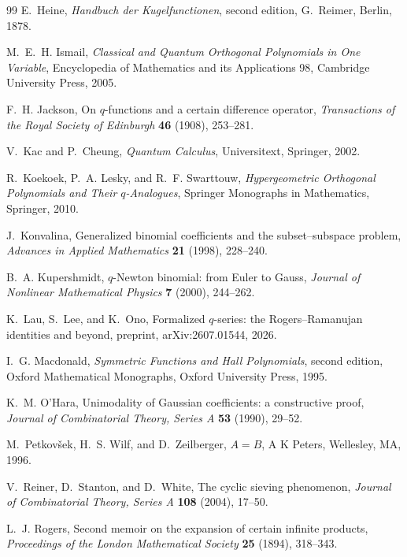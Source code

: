\documentclass[11pt,oneside,openany]{book}
\theoremstyle{definition}
\theoremstyle{remark}
\begin{document}
\begin{thebibliography}{99}
E.~Heine,
\emph{Handbuch der Kugelfunctionen}, second edition,
G.~Reimer, Berlin, 1878.

M.~E.~H. Ismail,
\emph{Classical and Quantum Orthogonal Polynomials in One Variable},
Encyclopedia of Mathematics and its Applications 98, Cambridge University Press, 2005.

F.~H. Jackson,
On $q$-functions and a certain difference operator,
\emph{Transactions of the Royal Society of Edinburgh} \textbf{46} (1908), 253--281.

V.~Kac and P.~Cheung,
\emph{Quantum Calculus},
Universitext, Springer, 2002.

R.~Koekoek, P.~A. Lesky, and R.~F. Swarttouw,
\emph{Hypergeometric Orthogonal Polynomials and Their $q$-Analogues},
Springer Monographs in Mathematics, Springer, 2010.

J.~Konvalina,
Generalized binomial coefficients and the subset--subspace problem,
\emph{Advances in Applied Mathematics} \textbf{21} (1998), 228--240.

B.~A. Kupershmidt,
$q$-Newton binomial: from Euler to Gauss,
\emph{Journal of Nonlinear Mathematical Physics} \textbf{7} (2000), 244--262.

K.~Lau, S.~Lee, and K.~Ono,
Formalized $q$-series: the Rogers--Ramanujan identities and beyond,
preprint, arXiv:2607.01544, 2026.

I.~G. Macdonald,
\emph{Symmetric Functions and Hall Polynomials}, second edition,
Oxford Mathematical Monographs, Oxford University Press, 1995.

K.~M. O'Hara,
Unimodality of Gaussian coefficients: a constructive proof,
\emph{Journal of Combinatorial Theory, Series A} \textbf{53} (1990), 29--52.

M.~Petkov\v{s}ek, H.~S. Wilf, and D.~Zeilberger,
\emph{$A=B$},
A K Peters, Wellesley, MA, 1996.

V.~Reiner, D.~Stanton, and D.~White,
The cyclic sieving phenomenon,
\emph{Journal of Combinatorial Theory, Series A} \textbf{108} (2004), 17--50.

L.~J. Rogers,
Second memoir on the expansion of certain infinite products,
\emph{Proceedings of the London Mathematical Society} \textbf{25} (1894), 318--343.


\end{thebibliography}
\end{document}
